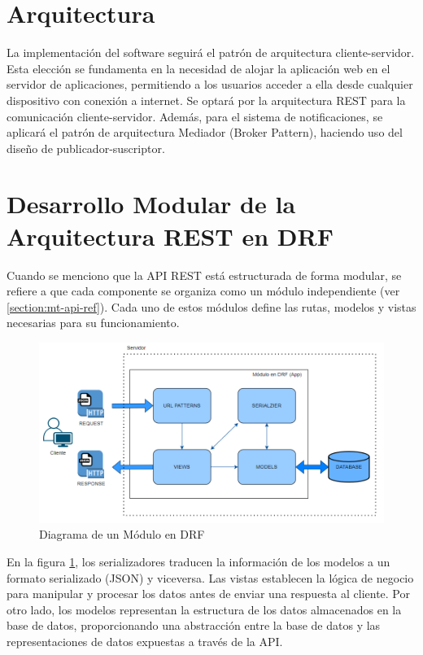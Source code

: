\section{Arquitectura}
La implementación del software seguirá el patrón de arquitectura cliente-servidor. Esta elección se fundamenta en la necesidad de alojar la aplicación web en el servidor de aplicaciones, permitiendo a los usuarios acceder a ella desde cualquier dispositivo con conexión a internet. Se optará por la arquitectura REST para la comunicación cliente-servidor. Además, para el sistema de notificaciones, se aplicará el patrón de arquitectura Mediador (Broker Pattern), haciendo uso del diseño de publicador-suscriptor.

\section{Desarrollo Modular de la Arquitectura REST en DRF}

Cuando se menciono que la API REST está estructurada de forma modular, se refiere a que cada componente se organiza como un módulo independiente (ver \ref{section:mt-api-ref}). Cada uno de estos módulos define las rutas, modelos y vistas necesarias para su funcionamiento.

\begin{figure}[H]
\centering
\includegraphics[width=1\linewidth]{fig/app-drf.png}
\caption{Diagrama de un Módulo en DRF}
\label{fig:app-drf}
\end{figure}

En la figura \ref{fig:app-drf}, los serializadores traducen la información de los modelos a un formato serializado (JSON) y viceversa. Las vistas establecen la lógica de negocio para manipular y procesar los datos antes de enviar una respuesta al cliente. Por otro lado, los modelos representan la estructura de los datos almacenados en la base de datos, proporcionando una abstracción entre la base de datos y las representaciones de datos expuestas a través de la API.

